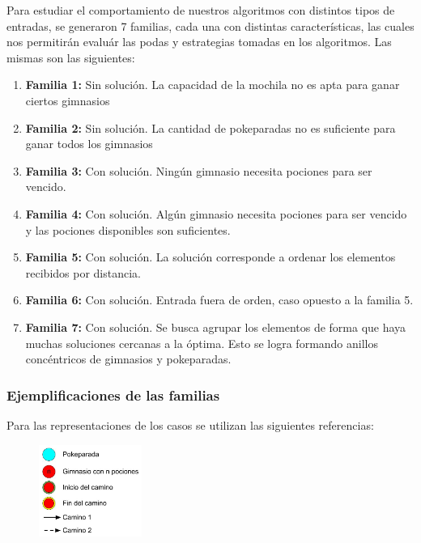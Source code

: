\indent Para estudiar el comportamiento de nuestros algoritmos con distintos tipos de entradas, se generaron 7 familias, cada una con distintas caracter\'isticas, las cuales nos permitirán evaluár las  podas y estrategias tomadas en los algoritmos. Las mismas son las siguientes:

\begin{enumerate}
\item {\bf Familia 1:}  Sin solución. La capacidad de la mochila no es apta para ganar ciertos gimnasios
\item {\bf Familia 2:} Sin soluci\'on. La cantidad de pokeparadas no es suficiente para ganar todos los gimnasios
\item {\bf Familia 3:} Con solución. Ning\'un gimnasio necesita pociones para ser vencido.
\item {\bf Familia 4:} Con solución. Algún gimnasio necesita pociones para ser vencido y las pociones disponibles son suficientes.
\item {\bf Familia 5:} Con solución. La solución corresponde a ordenar los elementos recibidos por distancia.
\item {\bf Familia 6:} Con solución. Entrada fuera de orden, caso opuesto a la familia 5.
\item {\bf Familia 7:} Con solución. Se busca agrupar los elementos de forma que haya muchas soluciones cercanas a la óptima. Esto se logra formando anillos conc\'entricos de gimnasios y pokeparadas.
\end{enumerate}


 \subsubsection*{Ejemplificaciones de las familias}
 
Para las representaciones de los casos se utilizan las siguientes referencias:
\begin{figure} [!ht]
\center
 \includegraphics[width=0.30\textwidth]{./EJ1/referencias.jpeg}
\end{figure}
 
